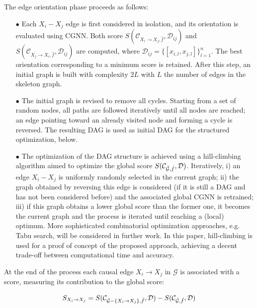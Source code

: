 \documentclass[a4paper, 11pt]{article}
\begin{document}
The edge orientation phase proceeds as follows:

\begin{itemize}
\item[$\bullet$] Each  $X_i-X_j$ edge is first considered in isolation, and its orientation is evaluated using CGNN. Both score $S(\mathcal{C}_{X_i \rightarrow X_j,\hat{f}}, \mathcal{D}_{ij})$ and $S(\mathcal{C}_{X_j \rightarrow X_i,\hat{f}}, \mathcal{D}_{ij})$ are computed, where $\mathcal{D}_{ij} = \{[x_{i,l}, x_{j,l}]\}_{l=1}^{n}$. The best orientation corresponding to a minimum score is retained.  After this step, an initial graph is built with complexity $2L$ with $L$ the number of edges in the skeleton graph. 
\item[$\bullet$] The initial graph is revised to remove all cycles. Starting from a set of random nodes, all paths are followed iteratively until all nodes are reached; an edge pointing toward an already visited node and forming a cycle is reversed. The resulting DAG is used as initial DAG for the structured optimization, below. 
\item[$\bullet$] The optimization of the DAG structure is achieved using a hill-climbing algorithm aimed to optimize  the global score $ S(\mathcal{C}_{\hat{\cal G},\hat{f}}, \mathcal{D})$. Iteratively, i) an edge $X_i-X_j$ is uniformly randomly selected in the current graph; ii) the graph obtained by reversing this edge is considered (if it is still a DAG and has not been considered before) and the associated global CGNN is retrained; iii) if this graph obtains a lower global score than the former one, it becomes the current graph and the process is iterated until reaching a (local) optimum. More sophisticated combinatorial optimization approaches, e.g. Tabu search, will be considered in further work. In this paper, hill-climbing is used for a proof of concept of the proposed approach, achieving a decent trade-off  between computational time and accuracy.
\end{itemize}

At the end of the process each causal  edge $X_i \rightarrow X_j$ in $\mathcal{G}$ is associated with a score, measuring its contribution to the global score:

\begin{equation}
S_{X_i \rightarrow X_j} = S(\mathcal{C}_{\hat{\mathcal{G}} - \{X_i \rightarrow X_j\},\hat{f}}, \mathcal{D}) - S(\mathcal{C}_{\hat{\cal G},\hat{f}}, \mathcal{D}) 
\label{score_edges}
\end{equation}
\end{document}
